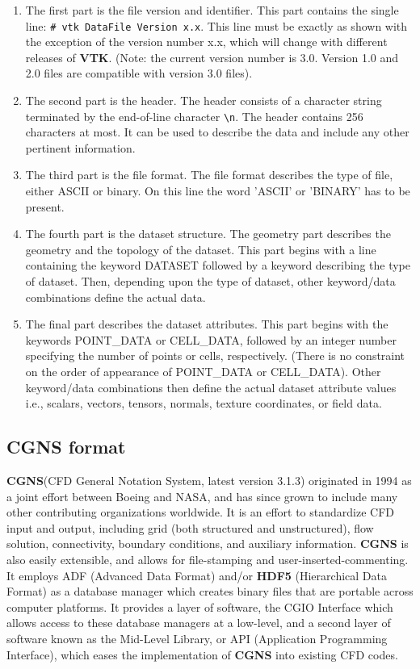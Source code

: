 \documentclass[a4paper,10pt]{article}
\newcommand{\vtk}{\textbf{VTK}\xspace}
\newcommand{\cgns}{\textbf{CGNS}\xspace}
\newcommand{\hdf}{\textbf{HDF5}\xspace}
\begin{document}
\begin{enumerate}
\setlength{\itemsep}{1pt}
\setlength{\parskip}{0pt}
\setlength{\parsep}{0pt}
\item The first part is the file version and identifier. This part contains the
single line: \verb+# vtk DataFile Version x.x+.  This line must be exactly as
shown with the exception of the version number x.x, which will change with
different releases of \vtk. (Note: the current version number is 3.0. Version
1.0 and 2.0 files are compatible with version 3.0 files).
\item The second part is the header. The header consists of a character string
terminated by the end-of-line character \verb+\n+. The header contains 256
characters at most. It can be used to describe the data and include any other
pertinent information.
\item The third part is the file format. The file format describes the type of
file, either ASCII or binary.  On this line the word 'ASCII' or 'BINARY' has to
be present.
\item The fourth part is the dataset structure. The geometry part describes the
geometry and the topology of the dataset. This part begins with a line
containing the keyword DATASET followed by a keyword describing the type of
dataset.  Then, depending upon the type of dataset, other keyword/data
combinations define the actual data.
\item The final part describes the dataset attributes. This part begins with
the keywords POINT\_DATA or CELL\_DATA, followed by an integer number
specifying the number of points or cells, respectively. (There is no constraint
on the order of appearance of POINT\_DATA or CELL\_DATA). Other keyword/data
combinations then define the actual dataset attribute values i.e., scalars,
vectors, tensors, normals, texture coordinates, or field data.
\end{enumerate}

\subsection{\cgns format\cite{cgns}}

\cgns (CFD General Notation System, latest version 3.1.3) originated in 1994 as
a joint effort between Boeing and NASA, and has since grown to include many
other contributing organizations worldwide. It is an effort to standardize CFD
input and output, including grid (both structured and unstructured), flow
solution, connectivity, boundary conditions, and auxiliary information. \cgns
is also easily extensible, and allows for file-stamping and
user-inserted-commenting. It employs ADF (Advanced Data Format) and/or \hdf
(Hierarchical Data Format) as a database manager which creates binary files
that are portable across computer platforms. It provides a layer of software,
the CGIO Interface which allows access to these database managers at a
low-level, and a second layer of software known as the Mid-Level Library, or
API (Application Programming Interface), which eases the implementation of
\cgns into existing CFD codes. 
\end{document}
